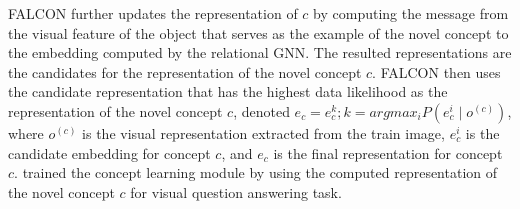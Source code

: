 FALCON further updates the representation of $c$ by computing the message from the visual feature of the object that serves as the example of the novel concept to the embedding computed by the relational GNN. The resulted representations are the candidates for the representation of the novel concept $c$.
FALCON then uses the candidate representation that has the highest data likelihood as the representation of the novel concept $c$, denoted $e_c = e_c^k; k = argmax_i P(e_c^i\mid o^{(c)})$, where $o^{(c)}$ is the visual representation extracted from the train image, $e_c^i$ is the candidate embedding for concept $c$, and $e_c$ is the final representation for concept $c$.
\citealt{mei2022falcon} trained the concept learning module by using the computed representation of the novel concept $c$ for visual question answering task.


 

